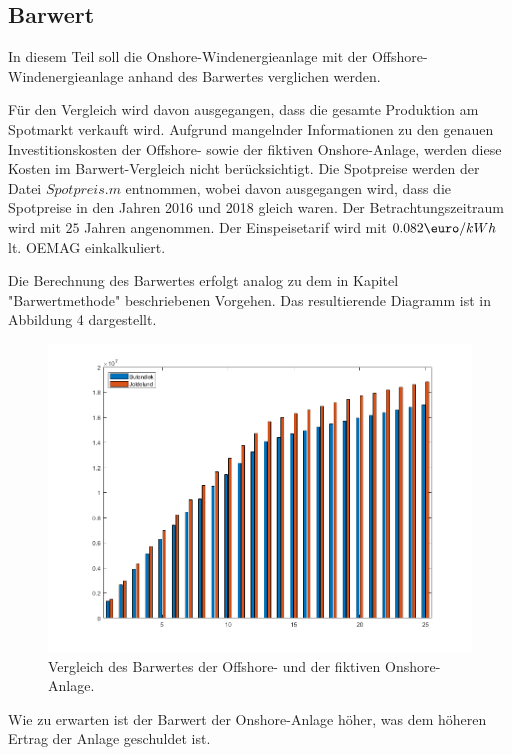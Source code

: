 \documentclass[a4paper,12pt]{article}
\begin{document}
	\subsection{Barwert}
	In diesem Teil soll die Onshore-Windenergieanlage mit der Offshore-Windenergieanlage anhand des Barwertes verglichen werden.\\ \par
	\noindent Für den Vergleich wird davon ausgegangen, dass die gesamte Produktion am Spotmarkt verkauft wird. Aufgrund mangelnder Informationen zu den genauen Investitionskosten der Offshore- sowie der fiktiven Onshore-Anlage, werden diese Kosten im Barwert-Vergleich nicht berücksichtigt.\newline
	Die Spotpreise werden der Datei $Spotpreis.m$ entnommen, wobei davon ausgegangen wird, dass die Spotpreise in den Jahren 2016 und 2018 gleich waren.
	\newline Der Betrachtungszeitraum wird mit $25$ Jahren angenommen. Der Einspeisetarif wird mit $0.082\mbox{\euro}/kWh$ lt. OEMAG einkalkuliert.\\ \par
	\noindent Die Berechnung des Barwertes erfolgt analog zu dem in Kapitel "Barwertmethode" beschriebenen Vorgehen.\newline
	Das resultierende Diagramm ist in Abbildung 4 dargestellt.
	\begin{figure}[H]
		\centering
		\includegraphics[width=12cm]{img/results/BarwertOnshoreOffshore}
		\caption{Vergleich des Barwertes der Offshore- und der fiktiven Onshore-Anlage.}
	\end{figure}
	\noindent Wie zu erwarten ist der Barwert der Onshore-Anlage höher, was dem höheren Ertrag der Anlage geschuldet ist.\newline
\end{document}
